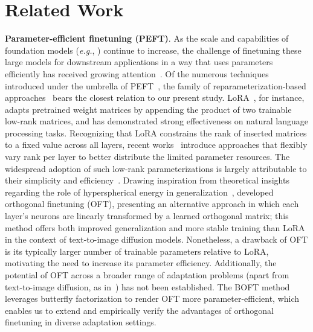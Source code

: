 \section{Related Work}

\textbf{Parameter-efficient finetuning (PEFT)}. As the scale and capabilities of foundation models (\emph{e.g.}, \cite{brown2020language,radford2021learning,rombach2022high,kirillov2023segment}) continue to increase, the challenge of finetuning these large models for downstream applications in a way that uses parameters efficiently has received growing attention~\cite{treviso2023efficient,ding2023parameter,lialin2023scaling}. Of the numerous techniques introduced under the umbrella of PEFT~\cite{houlsby2019parameter,aghajanyan2020intrinsic,hulora2022,edalati2022krona,wang2022adamix,gheini2021cross,zaken2022bitfit,guo2020parameter,sung2021training,ansell2022composable,lester2021power,li2021prefix,vu2022spot,he2021towards,mao2021unipelt,karimi2021compacter,liu2022few,sung2022lst,chen2022parameter,jia2022visual,chen2022adaptformer,zhang2022neural,jie2023fact,lian2022scaling,luo2023towards}, the family of reparameterization-based approaches~\cite{aghajanyan2020intrinsic,hulora2022,edalati2022krona} bears the closest relation to our present study. LoRA~\cite{hulora2022}, for instance, adapts pretrained weight matrices by appending the product of two trainable low-rank matrices, and has demonstrated strong effectiveness on natural language processing tasks. Recognizing that LoRA constrains the rank of inserted matrices to a fixed value across all layers, recent works~\cite{zhang2022adaptive,valipour2022dylora,zhang2023increlora} introduce approaches that flexibly vary rank per layer to better distribute the limited parameter resources. The widespread adoption of such low-rank parameterizations is largely attributable to their simplicity and efficiency~\cite{dettmers2023qlora,zi2023delta,chavan2023one}. Drawing inspiration from theoretical insights regarding the role of hyperspherical energy in generalization~\cite{liu2018learning,liu2021orthogonal}, \cite{qiu2023controlling} developed orthogonal finetuning (OFT), presenting an alternative approach in which each layer’s neurons are linearly transformed by a learned orthogonal matrix; this method offers both improved generalization and more stable training than LoRA in the context of text-to-image diffusion models. Nonetheless, a drawback of OFT is its typically larger number of trainable parameters relative to LoRA, motivating the need to increase its parameter efficiency. Additionally, the potential of OFT across a broader range of adaptation problems (apart from text-to-image diffusion, as in~\cite{qiu2023controlling}) has not been established. The BOFT method leverages butterfly factorization to render OFT more parameter-efficient, which enables us to extend and empirically verify the advantages of orthogonal finetuning in diverse adaptation settings.

